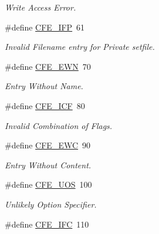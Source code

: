 \begin{DoxyCompactItemize}
\begin{DoxyCompactList}\small\item\em Write Access Error. \end{DoxyCompactList}\item 
\hypertarget{group__errors_ga939964b690f63b5484ec40fe8a4a7c56}{\#define \hyperlink{group__errors_ga939964b690f63b5484ec40fe8a4a7c56}{C\-F\-E\-\_\-\-I\-F\-P}~61}\label{group__errors_ga939964b690f63b5484ec40fe8a4a7c56}

\begin{DoxyCompactList}\small\item\em Invalid Filename entry for Private setfile. \end{DoxyCompactList}\item 
\hypertarget{group__errors_gac2b94fe4fcdaa5cc608add42857fd178}{\#define \hyperlink{group__errors_gac2b94fe4fcdaa5cc608add42857fd178}{C\-F\-E\-\_\-\-E\-W\-N}~70}\label{group__errors_gac2b94fe4fcdaa5cc608add42857fd178}

\begin{DoxyCompactList}\small\item\em Entry Without Name. \end{DoxyCompactList}\item 
\hypertarget{group__errors_ga8d3bbe7352edc6ec8ecf54150c80349f}{\#define \hyperlink{group__errors_ga8d3bbe7352edc6ec8ecf54150c80349f}{C\-F\-E\-\_\-\-I\-C\-F}~80}\label{group__errors_ga8d3bbe7352edc6ec8ecf54150c80349f}

\begin{DoxyCompactList}\small\item\em Invalid Combination of Flags. \end{DoxyCompactList}\item 
\hypertarget{group__errors_ga5457a3ff93e8c6d02be9c1813038f795}{\#define \hyperlink{group__errors_ga5457a3ff93e8c6d02be9c1813038f795}{C\-F\-E\-\_\-\-E\-W\-C}~90}\label{group__errors_ga5457a3ff93e8c6d02be9c1813038f795}

\begin{DoxyCompactList}\small\item\em Entry Without Content. \end{DoxyCompactList}\item 
\hypertarget{group__errors_gae30643e906d0e1fdd31f11f9c1523a52}{\#define \hyperlink{group__errors_gae30643e906d0e1fdd31f11f9c1523a52}{C\-F\-E\-\_\-\-U\-O\-S}~100}\label{group__errors_gae30643e906d0e1fdd31f11f9c1523a52}

\begin{DoxyCompactList}\small\item\em Unlikely Option Specifier. \end{DoxyCompactList}\item 
\hypertarget{group__errors_ga78354f23ff4d92bd3fd6dcb6bfd59f52}{\#define \hyperlink{group__errors_ga78354f23ff4d92bd3fd6dcb6bfd59f52}{C\-F\-E\-\_\-\-I\-F\-C}~110}\label{group__errors_ga78354f23ff4d92bd3fd6dcb6bfd59f52}


\end{DoxyCompactItemize}
